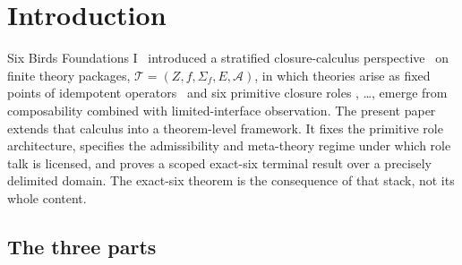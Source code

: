 \section{Introduction}\label{sec:introduction}

%
%

Six Birds Foundations I~\citep{Tsiokos2026SixBirdsFoundations}
introduced a stratified closure-calculus
perspective~\citep{Anderson1972} on finite theory packages,
\(\mathcal{T} = (Z, f, \Sigma_f, E, \mathcal{A})\), in which theories
arise as fixed points of idempotent
operators~\citep{DaveyPriestley2002} and six primitive closure roles
\Pone{}, \ldots, \Psix{} emerge from composability combined with
limited-interface observation. The present paper extends
that calculus into a theorem-level framework. It fixes the primitive
role architecture, specifies the admissibility and meta-theory regime
under which role talk is licensed, and proves a scoped exact-six
terminal result over a precisely delimited domain. The exact-six
theorem is the consequence of that stack, not its whole content.

\subsection{The three parts}\label{subsec:three-pillars}

